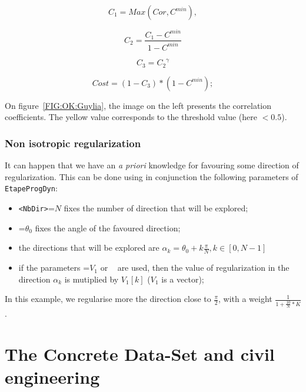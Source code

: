 \begin{equation}
    C_1=Max(Cor,C^{min}) ,
\end{equation}

\begin{equation}
   C_2 = \frac{C_1 -C^{min}}{1-C^{min}}
\end{equation}

\begin{equation}
   C_3 = {C_2} ^\gamma
\end{equation}

\begin{equation}
   Cost  = (1-C_3) * (1-C^{min});
\end{equation}

On figure~\ref{FIG:OK:Guylia}, the image on the left presents the correlation coefficients. The yellow value corresponds to the threshold value (here $<0.5$).


\subsubsection{Non isotropic regularization}

It can happen that we have an \emph{a priori} knowledge for favouring some direction of regularization.
This can be done using in conjunction the following parameters of {\tt EtapeProgDyn}:

\begin{itemize}
   \item  {\tt  <NbDir>}=$N$  fixes the number of direction that will be explored;
   \item  {\tt  <Teta0>}=$\theta_0$  fixes the angle of the favoured direction;
   \item  the directions that will be explored are $\alpha_k=\theta_0 + k\frac{\pi}{N} , k\in[0,N-1]$
   \item if the parameters  {\tt <Px1MultRegul>}=$V_1$ or {\tt <Px2MultRegul> } are used, then the value
         of regularization in the direction  $\alpha_k$ is  mutiplied by $V_1[k]$ ($V_1$ is a vector);
\end{itemize}

In this example, we regularise more the direction close to $\frac{\pi}{2}$, with a weight
$\frac{1}{1+\frac{10}{N}*K}$.



\section{The Concrete Data-Set and civil engineering}

